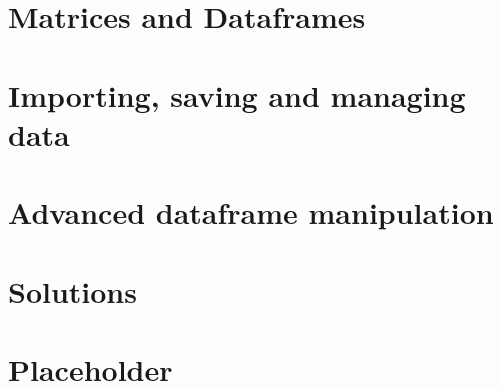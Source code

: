 \documentclass[]{book}
\theoremstyle{definition}
\theoremstyle{definition}
\theoremstyle{remark}
\begin{document}
\chapter{Matrices and Dataframes}\label{matricesdataframes}

\chapter{Importing, saving and managing data}\label{importingdata}

\chapter{Advanced dataframe manipulation}\label{advanceddataframe}

\chapter{Solutions}\label{solutions}

\chapter{Placeholder}\label{placeholder}


\end{document}
